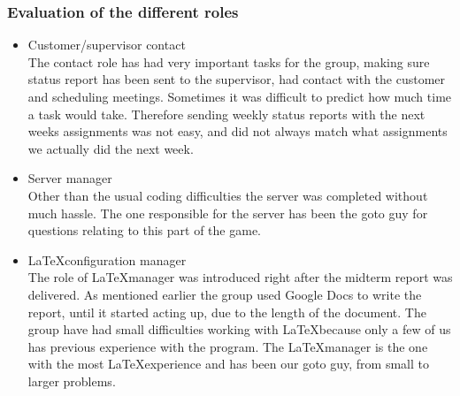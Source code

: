 \subsubsection{Evaluation of the different roles}
\begin{itemize} \setlength{\itemsep}{0cm}\setlength{\parskip}{0cm}
	\item Customer/supervisor contact \\
	The contact role has had very important tasks for the group, making sure status report has been sent to the supervisor,  had contact with the customer and scheduling meetings. Sometimes it was difficult to predict how much time a task would take. Therefore sending weekly status reports with the next weeks assignments was not easy, and did not always match what assignments we actually did the next week. 
	\item Server manager\\
Other than the usual coding difficulties the server was completed without much hassle. The one responsible for the server has been the goto guy for questions relating to this part of the game.
	\item \LaTeX configuration manager\\
The role of \LaTeX manager was introduced right after the midterm report was delivered. As mentioned earlier the group used Google Docs to write the report, until it started acting up, due to the length of the document. The group have had small difficulties working with \LaTeX because only a few of us has previous experience with the program. The \LaTeX manager is the one with the most \LaTeX experience and has been our goto guy, from small to larger problems.


\end{itemize}
